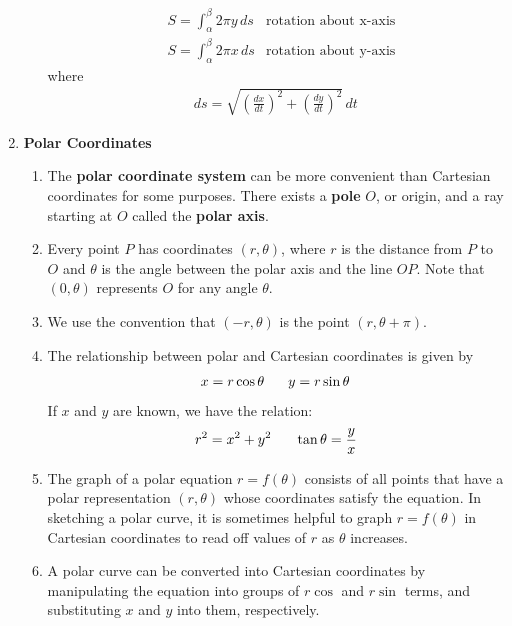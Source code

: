 \documentclass[10pt]{article}
\begin{document}
\begin{multicols*}{2}
\begin{enumerate}
\begin{enumerate}
\begin{align*}
            &S = \int_\alpha^\beta 2\pi y \, ds &\text{rotation about x-axis} \\
            &S = \int_\alpha^\beta 2\pi x \, ds &\text{rotation about y-axis}
        \end{align*}
        where
        \begin{align*}
            ds = \sqrt{ \left(\frac{dx}{dt}\right)^2 + \left(\frac{dy}{dt}\right)^2} \, dt
        \end{align*}
    \end{enumerate}
    
    \item \textbf{Polar Coordinates}
    \begin{enumerate}
        \item The \textbf{polar coordinate system} can be more convenient than Cartesian coordinates for some purposes. There exists a \textbf{pole} $O$, or origin, and a ray starting at $O$ called the \textbf{polar axis}. 
        \item Every point $P$ has coordinates $(r, \theta)$, where $r$ is the distance from $P$ to $O$ and $\theta$ is the angle between the polar axis and the line $OP$. Note that $(0, \theta)$ represents $O$ for any angle $\theta$. 
        \item We use the convention that $(-r, \theta)$ is the point $(r, \theta + \pi)$.
        \item The relationship between polar and Cartesian coordinates is given by
        \begin{align*}
            x = r \cos{\theta} \hspace{6mm} y = r \sin{\theta}
        \end{align*}
        If $x$ and $y$ are known, we have the relation:
        \begin{align*}
            r^2 = x^2 + y^2 \hspace{6mm} \tan{\theta} = \frac{y}{x}
        \end{align*}
        \item The graph of a polar equation $r = f(\theta)$ consists of all points that have a polar representation $(r, \theta)$ whose coordinates satisfy the equation. In sketching a polar curve, it is sometimes helpful to graph $r=f(\theta)$ in Cartesian coordinates to read off values of $r$ as $\theta$ increases.
        \item A polar curve can be converted into Cartesian coordinates by manipulating the equation into groups of $r\cos{}$ and $r\sin{}$ terms, and substituting $x$ and $y$ into them, respectively.

\end{enumerate}
\end{enumerate}
\end{multicols*}
\end{document}
